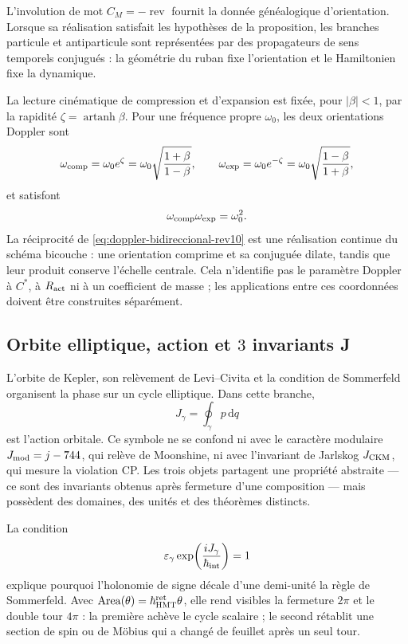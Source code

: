 L’involution de mot \(C_M=-\operatorname{rev}\) fournit la donnée généalogique d’orientation. Lorsque sa réalisation satisfait les hypothèses de la proposition, les branches particule et antiparticule sont représentées par des propagateurs de sens temporels conjugués : la géométrie du ruban fixe l’orientation et le Hamiltonien fixe la dynamique.

La lecture cinématique de compression et d’expansion est fixée, pour \(|\beta|<1\), par la rapidité \(\zeta=\operatorname{artanh}\beta\). Pour une fréquence propre \(\omega_0\), les deux orientations Doppler sont
\begin{equation}
 \omega_{\rm comp}=\omega_0e^{\zeta}
 =\omega_0\sqrt{\frac{1+\beta}{1-\beta}},\qquad
 \omega_{\rm exp}=\omega_0e^{-\zeta}
 =\omega_0\sqrt{\frac{1-\beta}{1+\beta}},
 \label{eq:doppler-bidireccional-rev10}
\end{equation}
et satisfont
\[
 \omega_{\rm comp}\omega_{\rm exp}=\omega_0^2.
\]
La réciprocité de \eqref{eq:doppler-bidireccional-rev10} est une réalisation continue du schéma bicouche : une orientation comprime et sa conjuguée dilate, tandis que leur produit conserve l’échelle centrale. Cela n’identifie pas le paramètre Doppler à \(C^*\), à \(R_{\rm act}\) ni à un coefficient de masse ; les applications entre ces coordonnées doivent être construites séparément.

\subsection{Orbite elliptique, action et \(3\) invariants J}

L’orbite de Kepler, son relèvement de Levi--Civita et la condition de Sommerfeld organisent la phase sur un cycle elliptique. Dans cette branche,
\[
 J_\gamma=\oint_\gamma p\,\mathrm dq
\]
est l’action orbitale. Ce symbole ne se confond ni avec le caractère modulaire \(J_{\rm mod}=j-744\), qui relève de Moonshine, ni avec l’invariant de Jarlskog \(J_{\rm CKM}\), qui mesure la violation CP. Les trois objets partagent une propriété abstraite --- ce sont des invariants obtenus après fermeture d’une composition --- mais possèdent des domaines, des unités et des théorèmes distincts.

La condition
\[
 \varepsilon_\gamma
 \exp\!\left(\frac{iJ_\gamma}{\hbar_{\rm int}}\right)=1
\]
explique pourquoi l’holonomie de signe décale d’une demi-unité la règle de Sommerfeld. Avec \(\operatorname{Area}(\theta)=\hbar_{\rm HMT}^{\rm ret}\theta\), elle rend visibles la fermeture \(2\pi\) et le double tour \(4\pi\) : la première achève le cycle scalaire ; le second rétablit une section de spin ou de Möbius qui a changé de feuillet après un seul tour.

